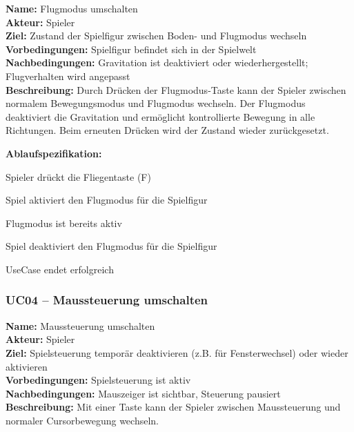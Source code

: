 \documentclass{article}
\begin{document}
\textbf{Name:} Flugmodus umschalten \\
\textbf{Akteur:} Spieler \\
\textbf{Ziel:} Zustand der Spielfigur zwischen Boden- und Flugmodus wechseln \\
\textbf{Vorbedingungen:} Spielfigur befindet sich in der Spielwelt \\
\textbf{Nachbedingungen:} Gravitation ist deaktiviert oder wiederhergestellt; Flugverhalten wird angepasst \\
\textbf{Beschreibung:} Durch Drücken der Flugmodus-Taste kann der Spieler zwischen normalem Bewegungsmodus und Flugmodus wechseln. Der Flugmodus deaktiviert die Gravitation und ermöglicht kontrollierte Bewegung in alle Richtungen. Beim erneuten Drücken wird der Zustand wieder zurückgesetzt.

\textbf{Ablaufspezifikation:}
\begin{description}[style=nextline,leftmargin=1.9cm,labelwidth=1.6cm]
  \item[1.] Spieler drückt die Fliegentaste (F)
  \item[2.] Spiel aktiviert den Flugmodus für die Spielfigur
  \item[2a.] Flugmodus ist bereits aktiv
  \item[2a.1.] Spiel deaktiviert den Flugmodus für die Spielfigur
  \item[3.] UseCase endet erfolgreich
\end{description}

\newpage

\subsubsection*{UC04 – Maussteuerung umschalten}

\textbf{Name:} Maussteuerung umschalten \\
\textbf{Akteur:} Spieler \\
\textbf{Ziel:} Spielsteuerung temporär deaktivieren (z.B. für Fensterwechsel) oder wieder aktivieren\\
\textbf{Vorbedingungen:} Spielsteuerung ist aktiv \\
\textbf{Nachbedingungen:} Mauszeiger ist sichtbar, Steuerung pausiert \\
\textbf{Beschreibung:} Mit einer Taste kann der Spieler zwischen Maussteuerung und normaler Cursorbewegung wechseln.
\end{document}
